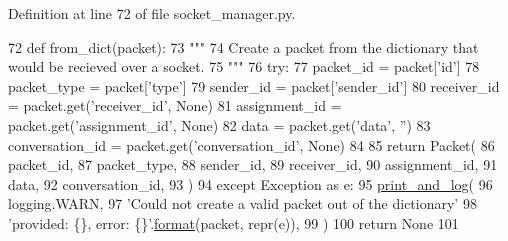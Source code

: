 Definition at line 72 of file socket\+\_\+manager.\+py.


\begin{DoxyCode}
72     \textcolor{keyword}{def }from\_dict(packet):
73         \textcolor{stringliteral}{"""}
74 \textcolor{stringliteral}{        Create a packet from the dictionary that would be recieved over a socket.}
75 \textcolor{stringliteral}{        """}
76         \textcolor{keywordflow}{try}:
77             packet\_id = packet[\textcolor{stringliteral}{'id'}]
78             packet\_type = packet[\textcolor{stringliteral}{'type'}]
79             sender\_id = packet[\textcolor{stringliteral}{'sender\_id'}]
80             receiver\_id = packet.get(\textcolor{stringliteral}{'receiver\_id'}, \textcolor{keywordtype}{None})
81             assignment\_id = packet.get(\textcolor{stringliteral}{'assignment\_id'}, \textcolor{keywordtype}{None})
82             data = packet.get(\textcolor{stringliteral}{'data'}, \textcolor{stringliteral}{''})
83             conversation\_id = packet.get(\textcolor{stringliteral}{'conversation\_id'}, \textcolor{keywordtype}{None})
84 
85             \textcolor{keywordflow}{return} Packet(
86                 packet\_id,
87                 packet\_type,
88                 sender\_id,
89                 receiver\_id,
90                 assignment\_id,
91                 data,
92                 conversation\_id,
93             )
94         \textcolor{keywordflow}{except} Exception \textcolor{keyword}{as} e:
95             \hyperlink{namespaceparlai_1_1mturk_1_1core_1_1dev_1_1test_1_1test__full__system_a5266aae537d9c5f37809ebaf7bcc3b49}{print\_and\_log}(
96                 logging.WARN,
97                 \textcolor{stringliteral}{'Could not create a valid packet out of the dictionary'}
98                 \textcolor{stringliteral}{'provided: \{\}, error: \{\}'}.\hyperlink{namespaceparlai_1_1chat__service_1_1services_1_1messenger_1_1shared__utils_a32e2e2022b824fbaf80c747160b52a76}{format}(packet, repr(e)),
99             )
100             \textcolor{keywordflow}{return} \textcolor{keywordtype}{None}
101 
\end{DoxyCode}
\mbox{\label{classparlai_1_1mturk_1_1core_1_1dev_1_1socket__manager_1_1Packet_a2525f38d0e5c24c92f4c1aed80423a37}} 

